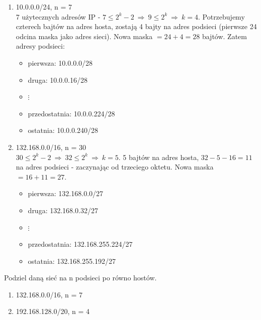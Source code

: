 \documentclass[12pt]{article}
\begin{document}
    \begin{enumerate}
        \item 10.0.0.0/24, n = 7\\
        7 użytecznych adresów IP - $7 \leq 2^k - 2 ~ \Rightarrow ~ 9 \leq 2^k ~ \Rightarrow ~ k = 4$. Potrzebujemy czterech
        bajtów na adres hosta, zostają 4 bajty na adres podsieci (pierwsze 24 odcina maska jako adres sieci). Nowa maska
        $= 24 + 4 = 28$ bajtów. Zatem adresy podsieci:
        \begin{itemize}
            \item pierwsza: 10.0.0.0/28
            \item druga: 10.0.0.16/28
            \item $\vdots$
            \item przedostatnia: 10.0.0.224/28
            \item ostatnia: 10.0.0.240/28
        \end{itemize}

        \item 132.168.0.0/16, n = 30\\
        $30 \leq 2^k - 2 ~ \Rightarrow ~ 32 \leq 2^k ~ \Rightarrow ~ k = 5$. 5 bajtów na adres hosta, $32-5-16 = 11$ na adres
        podsieci - zaczynając od trzeciego oktetu. Nowa maska $= 16 + 11 = 27$.
        \begin{itemize}
            \item pierwsza: 132.168.0.0/27
            \item druga: 132.168.0.32/27
            \item $\vdots$
            \item przedostatnia: 132.168.255.224/27
            \item ostatnia: 132.168.255.192/27
        \end{itemize}
    \end{enumerate}

    \begin{exercise}
        Podziel daną sieć na n podsieci po równo hostów.
        \begin{enumerate}
            \item 132.168.0.0/16, n = 7
            \item 192.168.128.0/20, n = 4
        \end{enumerate}
    \end{exercise}
\end{document}
